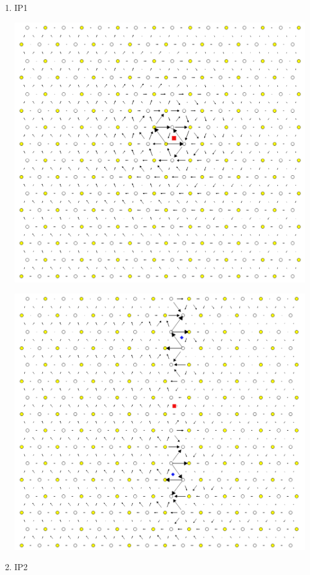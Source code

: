 \documentclass[11pt]{article}
\begin{document}
\begin{enumerate}
\begin{enumerate}
\item IP1
\label{sec:org801558c}
\begin{center}
\includegraphics[width=.9\linewidth]{Images/final_model_IP1_partial_dd_initial.png}
\end{center}
\begin{center}
\includegraphics[width=.9\linewidth]{Images/final_model_IP1_partial_dd_final.png}
\end{center}
\item IP2
\label{sec:org4492098}
\begin{center}

\end{center}
\end{enumerate}
\end{enumerate}
\end{document}
